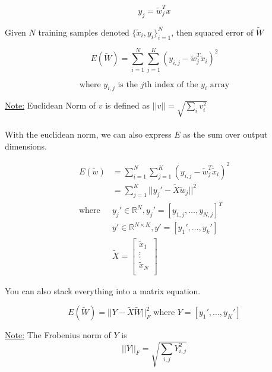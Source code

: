 \documentclass[12pt]{article}
\begin{document}
$$y_j = \tilde{w}_j^T x$$

Given $N$ training samples denoted $\{ \tilde{x}_i, y_i \}^N_{i=1}$, then squared error of $\tilde{W}$

$$E(\tilde{W}) = \sum^N_{i=1} \sum^K_{j=1} (y_{i,j} - \tilde{w}_j^T \tilde{x}_i)^2$$

$$\text{where $y_{i,j}$ is the $j$th index of the $y_i$ array}$$

\underline{Note:} Euclidean Norm of $v$ is defined as $||v|| = \sqrt{\sum_i v_i^2}$
\\
\\
With the euclidean norm, we can also express $E$ as the sum over output dimensions.

\begin{align*}
    E(\tilde{w}) &= \sum^N_{i=1} \sum^K_{j=1} (y_{i,j} - \tilde{w}_j^T\tilde{x}_i)^2\\
    &= \sum^K_{j=1} ||y_j'- \tilde{X}\tilde{w}_j ||^2\\
    \text{where } & y_j' \in\mathbb{R}^N, y_j' = [y_{1,j},\dots, y_{N,j}]^T\\
                  & y' \in\mathbb{R}^{N \times K}, y' = [y_1',\dots, y_k']\\
                  & \tilde{X} = \begin{bmatrix}
  \tilde{x}_{1} \\
   \vdots \\
   \tilde{x}_{N}\\
 \end{bmatrix}
\end{align*}

You can also stack everything into a matrix equation.

$$E(\tilde{W}) = ||Y - \tilde{X}\tilde{W}||^2_F \text{ where } Y = [y_1',\dots, y_K']$$

\underline{Note:} The Frobenius norm of $Y$ is
$$||Y||_F = \sqrt{\sum_{i,j} Y^2_{i,j}}$$
\end{document}

